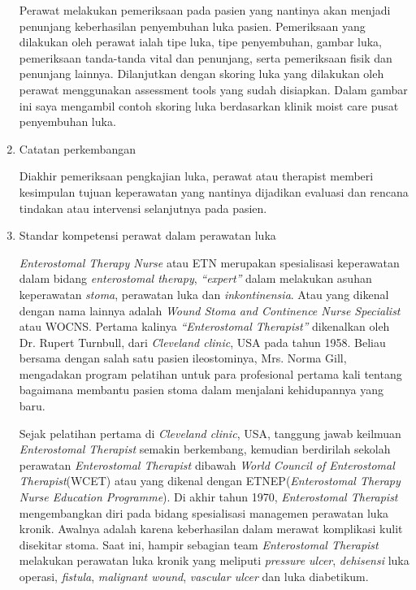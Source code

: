 \begin{enumerate}
Perawat melakukan pemeriksaan pada pasien yang nantinya akan menjadi penunjang keberhasilan penyembuhan luka pasien. Pemeriksaan yang dilakukan oleh perawat ialah tipe luka, tipe penyembuhan, gambar luka, pemeriksaan tanda-tanda vital dan penunjang, serta pemeriksaan fisik dan penunjang lainnya.
Dilanjutkan dengan skoring luka yang dilakukan oleh perawat menggunakan assessment tools yang sudah disiapkan. Dalam gambar ini saya mengambil contoh skoring luka berdasarkan klinik moist care pusat penyembuhan luka.

\item Catatan perkembangan

Diakhir pemeriksaan pengkajian luka, perawat atau therapist memberi kesimpulan tujuan keperawatan yang nantinya dijadikan evaluasi dan rencana tindakan atau intervensi selanjutnya pada pasien.

\item Standar kompetensi perawat dalam perawatan luka

\textit{Enterostomal Therapy Nurse} atau ETN merupakan spesialisasi keperawatan dalam bidang \textit{enterostomal therapy}, \textit{“expert”} dalam melakukan asuhan keperawatan \textit{stoma}, perawatan luka dan \textit{inkontinensia}. Atau yang dikenal dengan nama lainnya adalah \textit{Wound Stoma and Continence Nurse Specialist} atau WOCNS. Pertama kalinya \textit{“Enterostomal Therapist”} dikenalkan oleh Dr. Rupert Turnbull, dari \textit{Cleveland clinic}, USA pada tahun 1958. Beliau bersama dengan salah satu pasien ileostominya, Mrs. Norma Gill, mengadakan program pelatihan untuk para profesional pertama kali tentang bagaimana membantu pasien stoma dalam menjalani kehidupannya yang baru.

Sejak pelatihan pertama di \textit{Cleveland clinic}, USA, tanggung jawab keilmuan \textit{Enterostomal Therapist} semakin berkembang, kemudian berdirilah sekolah perawatan \textit{Enterostomal Therapist} dibawah \textit{World Council of Enterostomal Therapist}(WCET) atau yang dikenal dengan ETNEP(\textit{Enterostomal Therapy Nurse Education Programme}).
Di akhir tahun 1970, \textit{Enterostomal Therapist} mengembangkan diri pada bidang spesialisasi managemen perawatan luka kronik. Awalnya adalah karena keberhasilan dalam merawat komplikasi kulit disekitar stoma. Saat ini, hampir sebagian team \textit{Enterostomal Therapist} melakukan perawatan luka kronik yang meliputi \textit{pressure ulcer}, \textit{dehisensi} luka operasi, \textit{fistula}, \textit{malignant wound}, \textit{vascular ulcer} dan luka diabetikum.


\end{enumerate}

